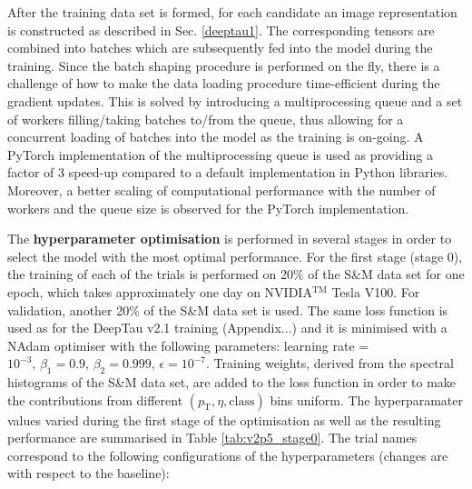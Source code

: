 After the training data set is formed, for each \tauh candidate an image representation is constructed as described in Sec. \ref{deeptau1}. The corresponding tensors are combined into batches which are subsequently fed into the model during the training. Since the batch shaping procedure is performed on the fly, there is a challenge of how to make the data loading procedure time-efficient during the gradient updates. This is solved by introducing a multiprocessing queue and a set of workers filling/taking batches to/from the queue, thus allowing for a concurrent loading of batches into the model as the training is on-going. A PyTorch \cite{NEURIPS2019_9015} implementation of the multiprocessing queue is used as providing a factor of 3 speed-up compared to a default implementation in Python libraries. Moreover, a better scaling of computational performance with the number of workers and the queue size is observed for the PyTorch implementation. 

The \textbf{hyperparameter optimisation} is performed in several stages in order to select the model with the most optimal performance. For the first stage (stage 0), the training of each of the trials is performed on 20\% of the S\&M data set for one epoch, which takes approximately one day on NVIDIA$^\text{TM}$ Tesla V100. For validation, another 20\% of the S\&M data set is used. The same loss function is used as for the DeepTau v2.1 training (Appendix...) and it is minimised with a NAdam optimiser with the following parameters: learning rate = $10^{-3}, \, \beta_1 = 0.9, \, \beta_2 = 0.999, \,  \epsilon=10^{-7}$. Training weights, derived from the spectral histograms of the S\&M data set, are added to the loss function in order to make the contributions from different $(p_\text{T}, \eta, \text{class})$ bins uniform. The hyperparamater values varied during the first stage of the optimisation as well as the resulting performance are summarised in Table \ref{tab:v2p5_stage0}. The trial names correspond to the following configurations of the hyperparameters (changes are with respect to the baseline):

